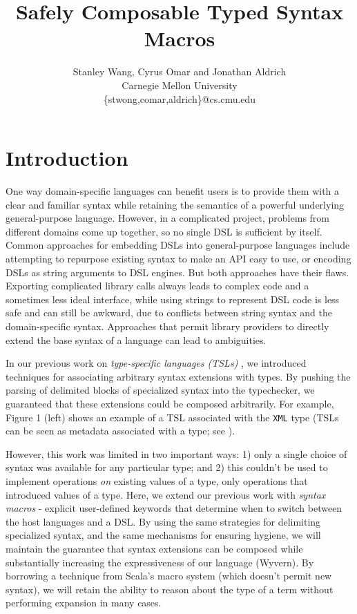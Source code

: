 \documentclass[letterpaper, notitlepage]{article}
\begin{document}
\title{Safely Composable Typed Syntax Macros}
\author{Stanley Wang, Cyrus Omar and Jonathan Aldrich\\
Carnegie Mellon University\\
\{stwong,comar,aldrich\}@cs.cmu.edu}
\date{}
\maketitle

\section{Introduction}
One way domain-specific languages can benefit users is to provide them with a clear and familiar syntax while retaining the semantics of a powerful underlying general-purpose language. However, in a complicated project, problems from different domains come up together, so no single DSL is sufficient by itself. Common approaches for embedding DSLs into general-purpose languages include attempting to repurpose existing syntax to make an API easy to use, or encoding DSLs as string arguments to DSL engines. But both approaches have their flaws. Exporting complicated library calls always leads to complex code and a sometimes less ideal interface, while using strings to represent DSL code is less safe and can still be awkward, due to conflicts between string syntax and the domain-specific syntax. Approaches that permit library providers to directly extend the base syntax of a language can lead to ambiguities.

In our previous work on \emph{type-specific languages (TSLs)} \cite{TSLs}, we introduced techniques for associating arbitrary syntax extensions with types. By pushing the parsing of delimited blocks of specialized syntax into the typechecker, we guaranteed that these extensions could be composed arbitrarily. For example, Figure 1 (left) shows an example of a TSL associated with the \verb|XML| type (TSLs can be seen as metadata associated with a type; see \cite{TSLs}).

However, this work was limited in two important ways: 1) only a single choice of syntax was available for any particular type; and 2) this couldn't be used to implement operations \emph{on} existing values of a type, only operations that introduced values of a type. Here, we extend our previous work with \emph{syntax macros} - explicit user-defined keywords that determine when to switch between the host languages and a DSL. By using the same strategies for delimiting specialized syntax, and the same mechanisms for ensuring hygiene, we will maintain the guarantee that syntax extensions can be composed while substantially increasing the expressiveness of our language (Wyvern). By borrowing a technique from Scala's macro system (which doesn't permit new syntax), we will retain the ability to reason about the type of a term without performing expansion in many cases.
\end{document}

